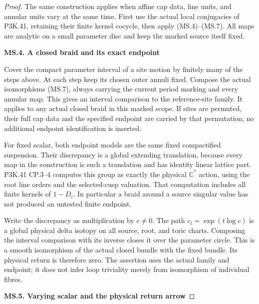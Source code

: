 \begin{proof}
The same construction applies when affine cap data, line units, and
annular units vary at the same time. First use the actual local
conjugacies of P3K.41, retaining their finite kernel cocycle, then
apply (MS.4)--(MS.7). All maps are analytic on a small parameter disc
and keep the marked source itself fixed.

\par

\medskip\noindent\textbf{MS.4. A closed braid and its exact endpoint}

\par\nobreak

Cover the compact parameter interval of a site motion by finitely many
of the steps above. At each step keep its chosen outer annuli fixed.
Compose the actual isomorphisms (MS.7), always carrying the current
period marking and every annular map. This gives an interval
comparison to the reference-site family. It applies to any actual
closed braid in this marked scope. If sites are permuted, their full
cap data and the specified endpoint are carried by that permutation;
no additional endpoint identification is inserted.

For fixed scalar, both endpoint models are the same fixed compactified
suspension. Their discrepancy is a global extending translation,
because every map in the construction is such a translation and
has identity linear lattice part. P3K.41 CP.3--4 computes this group
as exactly the physical \(\mathbb C^*\) action, using the root
line orders and the selected-cusp valuation. That computation includes
all finite kernels of \(1-D_i\). In particular a braid around
a source singular value has not produced an untested finite endpoint.

Write the discrepancy as multiplication by \(c\ne0\). The
path \(c_t=\exp(t\log c)\) is a global physical delta isotopy
on all source, root, and toric charts. Composing the interval
comparison with its inverse closes it over the parameter circle.
This is a smooth isomorphism of the actual closed bundle with the
fixed bundle. Its physical return is therefore zero. The assertion
uses the actual family and endpoint; it does not infer loop
triviality merely from isomorphism of individual fibres.

\par

\medskip\noindent\textbf{MS.5. Varying scalar and the physical return arrow}

\par\nobreak


\end{proof}
